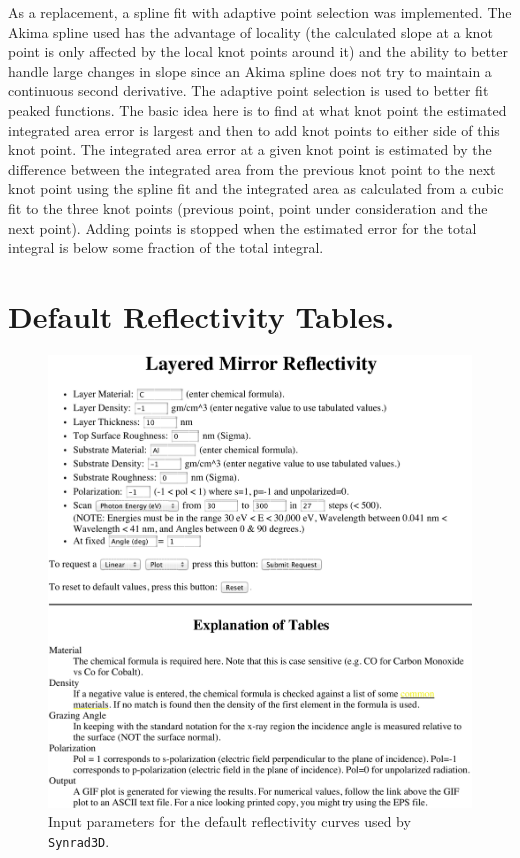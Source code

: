 \documentclass[11pt,openany]{report}
\newcommand{\srthree}{\texttt{Synrad3D}\xspace}
\begin{document}
{{{{As a replacement, a spline fit with adaptive point selection was implemented. The Akima spline
used\cite{b:akima} has the advantage of locality (the calculated slope at a knot point is only
affected by the local knot points around it) and the ability to better handle large changes in slope
since an Akima spline does not try to maintain a continuous second derivative. The adaptive point
selection is used to better fit peaked functions. The basic idea here is to find at what knot point
the estimated integrated area error is largest and then to add knot points to either side of this
knot point. The integrated area error at a given knot point is estimated by the difference between
the integrated area from the previous knot point to the next knot point using the spline fit and the
integrated area as calculated from a cubic fit to the three knot points (previous point, point under
consideration and the next point). Adding points is stopped when the estimated error for the total
integral is below some fraction of the total integral.

\chapter{Default Reflectivity Tables.}
\label{s:dflt.reflect}

  \begin{figure}
  \centering
  \includegraphics[width=5in]{Layered_Mirror_Reflectivity.pdf}
  \caption[Input parameters for the default reflectivity curves.]
  {
Input parameters for the default reflectivity curves used by \srthree.
  }
\label{f:reflect}
  \end{figure}

}}}}
\end{document}
